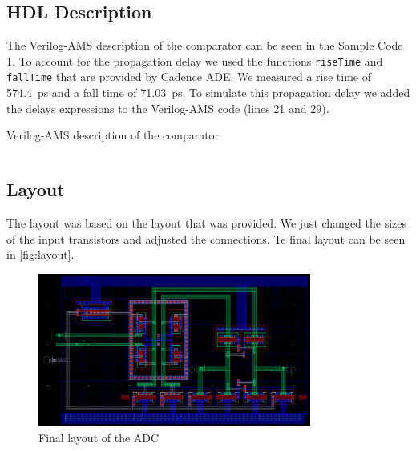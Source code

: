 \documentclass{article}
\begin{document}
 \subsection{HDL Description}
 The Verilog-AMS description of the comparator can be seen in the Sample Code 1. To account for the propagation delay we used the functions \texttt{riseTime} and \texttt{fallTime} that are provided by Cadence ADE. We measured a rise time of \SI{574.4}{\ps} and a fall time of \SI{71.03}{\ps}. To simulate this propagation delay we added the delays expressions to the Verilog-AMS code (lines 21 and 29).
 \begin{listing}
  \caption{Verilog-AMS description of the comparator}
  \inputminted{verilog}{../milestone1/comparator/comp_v2/verilogams/verilog.vams}
 \end{listing}
 
 \subsection{Layout}
 The layout was based on the layout that was provided. We just changed the sizes of the input transistors and adjusted the connections. Te final layout can be seen in \autoref{fig:layout}.

 \begin{figure}[h]
  \centering
  \includegraphics[width=0.8\textwidth]{img/layout}
  \caption{Final layout of the ADC}
  \label{fig:layout}
 \end{figure}
\end{document}
